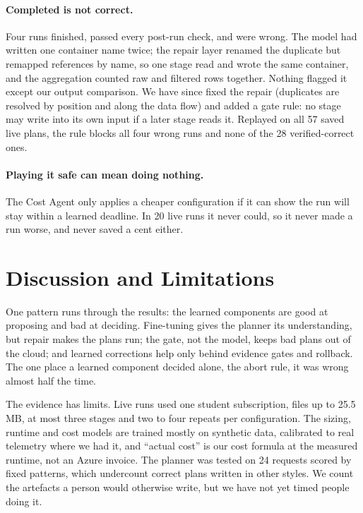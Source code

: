 \documentclass[runningheads]{llncs}
\begin{document}
\paragraph{Completed is not correct.} Four runs finished, passed every post-run check, and were wrong. The
model had written one container name twice; the repair layer renamed the duplicate but remapped references
by name, so one stage read and wrote the same container, and the aggregation counted raw and filtered rows
together. Nothing flagged it except our output comparison. We have since fixed the repair (duplicates are
resolved by position and along the data flow) and added a gate rule: no stage may write into its own input
if a later stage reads it. Replayed on all 57 saved live plans, the rule blocks all four wrong runs and none of
the 28 verified-correct ones.

\paragraph{Playing it safe can mean doing nothing.} The Cost Agent only applies a cheaper configuration if
it can show the run will stay within a learned deadline. In 20 live runs it never could, so it never made a
run worse, and never saved a cent either.

\section{Discussion and Limitations}

One pattern runs through the results: the learned components are good at proposing and bad at deciding.
Fine-tuning gives the planner its understanding, but repair makes the plans run; the gate, not the model,
keeps bad plans out of the cloud; and learned corrections help only behind evidence gates and rollback. The
one place a learned component decided alone, the abort rule, it was wrong almost half the time.

The evidence has limits. Live runs used one student subscription, files up to 25.5\,MB, at most three stages
and two to four repeats per configuration. The sizing, runtime and cost models are trained mostly on synthetic
data, calibrated to real telemetry where we had it, and ``actual cost'' is our cost formula at the measured
runtime, not an Azure invoice. The planner was tested on 24 requests scored by fixed patterns, which undercount
correct plans written in other styles. We count the artefacts a person would otherwise write, but we have not
yet timed people doing it.
\end{document}
